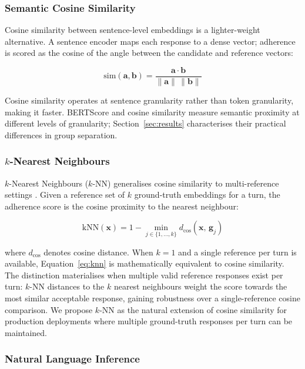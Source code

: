 \documentclass[11pt,a4paper]{article}
\begin{document}
\subsubsection{Semantic Cosine Similarity}

Cosine similarity between sentence-level embeddings \citep{reimers2019sentencebert}
is a lighter-weight alternative. A sentence encoder maps each response to a
dense vector; adherence is scored as the cosine of the angle between the
candidate and reference vectors:

\begin{equation}
  \text{sim}(\mathbf{a}, \mathbf{b}) =
  \frac{\mathbf{a} \cdot \mathbf{b}}{\|\mathbf{a}\|\,\|\mathbf{b}\|}
\end{equation}

Cosine similarity operates at sentence granularity rather than token
granularity, making it faster. BERTScore and cosine similarity measure
semantic proximity at different levels of granularity; Section~\ref{sec:results}
characterises their practical differences in group separation.

\subsubsection{$k$-Nearest Neighbours}

$k$-Nearest Neighbours ($k$-NN) generalises cosine similarity to
multi-reference settings \citep{cover1967nearest}. Given a reference set of
$k$ ground-truth embeddings for a turn, the adherence score is the cosine
proximity to the nearest neighbour:

\begin{equation}
  \text{kNN}(\mathbf{x}) = 1 - \min_{j \in \{1,\ldots,k\}} d_{\cos}(\mathbf{x},\, \mathbf{g}_j)
  \label{eq:knn}
\end{equation}

where $d_{\cos}$ denotes cosine distance. When $k = 1$ and a single reference
per turn is available, Equation~\ref{eq:knn} is mathematically equivalent to
cosine similarity. The distinction materialises when multiple valid reference
responses exist per turn: $k$-NN distances to the $k$ nearest neighbours weight
the score towards the most similar acceptable response, gaining robustness over
a single-reference cosine comparison. We propose $k$-NN as the natural
extension of cosine similarity for production deployments where multiple
ground-truth responses per turn can be maintained.

\subsubsection{Natural Language Inference}
\end{document}
